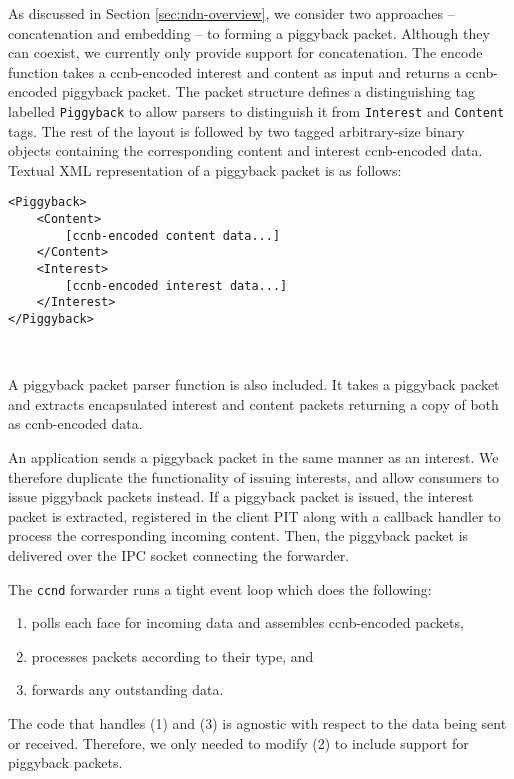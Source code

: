 \documentclass[conference]{IEEEtran}
\begin{document}
As discussed in Section \ref{sec:ndn-overview}, we consider two approaches -- concatenation
and embedding -- to forming a 
piggyback packet. Although they can coexist, we currently only provide support for concatenation.
The encode function takes a ccnb-encoded interest and content as input and 
returns a ccnb-encoded piggyback packet. The packet structure defines a 
distinguishing tag labelled \verb|Piggyback| to allow parsers to distinguish it
from \verb|Interest| and \verb|Content| tags. The rest of the layout is followed 
by two tagged arbitrary-size binary objects containing the corresponding 
content and interest ccnb-encoded data. Textual XML representation of a piggyback 
packet is as follows: \\

\begin{minipage}{0.448\textwidth}
\hrulefill
\begin{verbatim}
<Piggyback>
    <Content>
        [ccnb-encoded content data...]
    </Content>
    <Interest>
        [ccnb-encoded interest data...]
    </Interest>
</Piggyback>
\end{verbatim}
\hrulefill\\
\end{minipage}

A piggyback packet parser function is also included. It takes a piggyback packet and extracts 
encapsulated interest and content packets returning a copy of both as ccnb-encoded data.

An application sends a piggyback packet in the same manner as an interest. We therefore duplicate the 
functionality of issuing interests, and allow consumers to issue piggyback packets instead. If a piggyback 
packet is issued, the interest packet is extracted, registered in the client PIT along with a callback handler 
to process the corresponding incoming content. Then, the piggyback packet is delivered over the 
IPC socket connecting the forwarder.

The \verb|ccnd| forwarder runs a tight event loop which does the following: 
\begin{enumerate}
\item polls each face for incoming data and assembles ccnb-encoded packets, 
\item processes packets according to their type, and 
\item forwards any outstanding data.
\end{enumerate}
The code that handles (1) and (3) is agnostic with respect to the data being sent or received. 
Therefore, we only needed to modify (2) to include support for piggyback packets.
\end{document}
